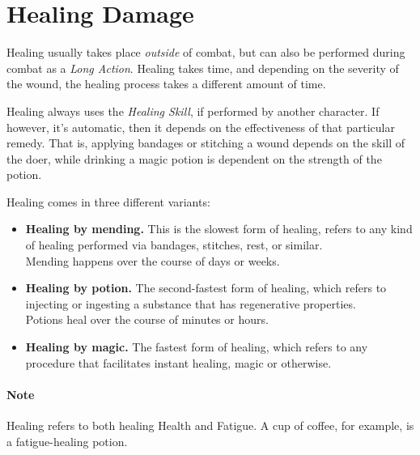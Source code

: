 \section{Healing Damage}
Healing usually takes place \textit{outside} of combat, but can also be performed during combat as a \textit{Long Action}.
Healing takes time, and depending on the severity of the wound, the healing process takes a different amount of time.

Healing always uses the \textit{Healing Skill}, if performed by another character.
If however, it's automatic, then it depends on the effectiveness of that particular remedy.
That is, applying bandages or stitching a wound depends on the skill of the doer, while drinking a magic potion is dependent on the strength of the potion.

Healing comes in three different variants:

\begin{center}
  \begin{itemize}
  \item \textbf{Healing by mending.}
    This is the slowest form of healing, refers to any kind of healing performed via bandages, stitches, rest, or similar.\\
    Mending happens over the course of days or weeks.
  \item \textbf{Healing by potion.}
    The second-fastest form of healing, which refers to injecting or ingesting a substance that has regenerative properties. \\
    Potions heal over the course of minutes or hours.
  \item \textbf{Healing by magic.}
    The fastest form of healing, which refers to any procedure that facilitates instant healing, magic or otherwise.
  \end{itemize}
\end{center}

\paragraph{Note} Healing refers to both healing Health and Fatigue.
A cup of coffee, for example, is a fatigue-healing potion.
